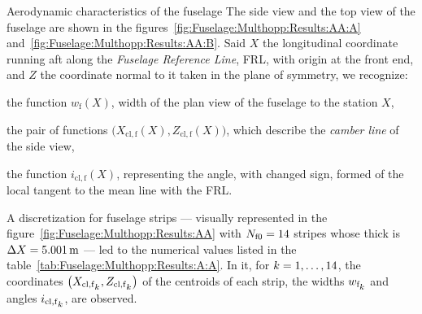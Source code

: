 \documentclass[[12pt,twoside]{book}
\begin{document}
\begin{myExampleX}{Aerodynamic characteristics of the fuselage}{}
The side view and the top view of the fuselage are shown in the
figures~\ref{fig:Fuselage:Multhopp:Results:AA:A} and~\ref{fig:Fuselage:Multhopp:Results:AA:B}.
Said $X$ the longitudinal coordinate running aft along
the \emph{Fuselage Reference Line}, FRL,
with origin at the front end, and $Z$ the coordinate normal to it
taken in the plane of symmetry, we recognize:
\begin{compactitem}[{\color{gray}$\circ$}]%
\item
the function $w_\mathrm{f}(X)$, width of the plan view of the fuselage to the station $X$,
\item
the pair of functions
$\big(X_\mathrm{cl,f}(X),Z_\mathrm{cl,f}(X)\big)$, which describe the \emph{camber line} of the side view,
\item
the function $i_\mathrm{cl,f}(X)$, representing the angle, with changed sign, formed of the local tangent to the mean line with the FRL.
\end{compactitem}
A discretization for fuselage strips --- visually represented in the
figure~\ref{fig:Fuselage:Multhopp:Results:AA} 
with  $N_{\mathrm{f}0}=\num[round-precision=0]{\myNoStripCMZeroBody}$ stripes
whose thick is $\upDelta X=\SI[round-precision=1]{\myDxStripCMZeroBodyMT}{m}$
---
led to the numerical values listed in the table~\ref{tab:Fuselage:Multhopp:Results:A:A}.
In it, for $k=1,\ldots,\num[round-precision=0]{\myNoStripCMZeroBody}$, the coordinates
$\big(X_{\mathrm{cl,f}_\mathlarger{k}},Z_{\mathrm{cl,f}_\mathlarger{k}}\big)$ of the centroids
of each strip, the widths $w_{\mathrm{f}_\mathlarger{k}}$ 
and angles $i_{\mathrm{cl,f}_\mathlarger{k}}$, are observed.


\end{myExampleX}
\end{document}
